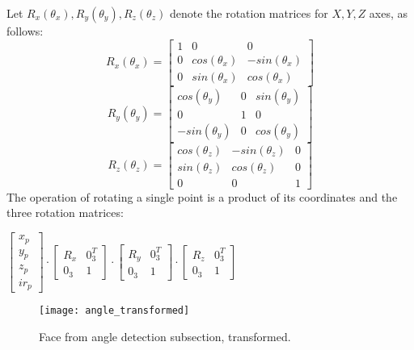         Let $R_x(\theta_x), R_y(\theta_y), R_z(\theta_z)$ denote the rotation matrices
        for $X, Y, Z$ axes, as follows:
        \[
        R_x(\theta_x) =
        \begin{bmatrix}
        1 & 0 & 0\\
        0 & cos(\theta_x) & -sin(\theta_x)\\
        0 & sin(\theta_x) & cos(\theta_x)
        \end{bmatrix}
        \]
        \[
        R_y(\theta_y) =
        \begin{bmatrix}
        cos(\theta_y) & 0 & sin(\theta_y)\\
        0 & 1 & 0\\
        -sin(\theta_y) & 0 & cos(\theta_y)
        \end{bmatrix}
        \]
        \[
        R_z(\theta_z) =
        \begin{bmatrix}
        cos(\theta_z) & -sin(\theta_z) & 0\\
        sin(\theta_z) & cos(\theta_z) & 0\\
        0 & 0 & 1
        \end{bmatrix}
        \]
        The operation of rotating a single point is a product of its coordinates and the three rotation matrices:
        \begin{center}
        $
        \begin{bmatrix}
          x_p\\
          y_p\\
          z_p\\
          ir_p
        \end{bmatrix}
        \cdot
        \begin{bmatrix}
          R_x & 0_{3}^T\\
          0_{3} & 1
        \end{bmatrix}
        \cdot
        \begin{bmatrix}
          R_y & 0_{3}^T\\
          0_{3} & 1
        \end{bmatrix}
        \cdot
        \begin{bmatrix}
          R_z & 0_{3}^T\\
          0_{3} & 1
        \end{bmatrix}
        $
        \end{center}


        \begin{figure}[H]
        \caption{Face from angle detection subsection, transformed.}
        \centering
        \texttt{[image: angle\_transformed]}
        \end{figure}

